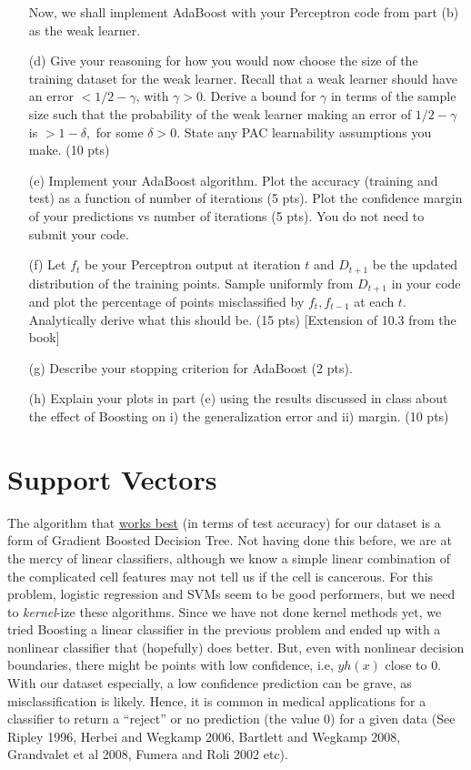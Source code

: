 \documentclass[12pt]{article}
\begin{document}
\begin{itemize}
		Now, we shall implement AdaBoost with your Perceptron code from part (b) as the weak learner. 
	\item[(d)] Give your reasoning for how you would now choose the size of the training dataset for the weak learner. Recall that a weak learner should have an error $< 1/2 - \gamma$, with $\gamma > 0$. Derive a bound for $\gamma$ in terms of the sample size such that the probability of the weak learner making an error of $1/2 - \gamma$ is $> 1- \delta,$ for some $\delta > 0.$ State any PAC learnability assumptions you make. (10 pts)
	\item[(e)] Implement your AdaBoost algorithm. Plot the accuracy (training and test) as a function of number of iterations (5 pts). Plot the confidence margin of your predictions vs number of iterations (5 pts). You do not need to submit your code.
	\item[(f)] Let $f_t$ be your Perceptron output at iteration $t$ and $D_{t+1}$ be the updated distribution of the training points. Sample uniformly from $D_{t+1}$ in your code and plot the percentage of points misclassified by $f_t, f_{t-1}$ at each $t$. Analytically derive what this should be. (15 pts) [Extension of 10.3 from the book]
	\item[(g)] Describe your stopping criterion for AdaBoost (2 pts).
	\item[(h)] Explain your plots in part (e) using the results discussed in class about the effect of Boosting on i) the generalization error and ii) margin.  (10 pts)


\end{itemize}

\section{Support Vectors}

The algorithm that \href{https://archive.ics.uci.edu/dataset/17/breast+cancer+wisconsin+diagnostic}{works best} (in terms of test accuracy) for our dataset is a form of Gradient Boosted Decision Tree. Not having done this before, we are at the mercy of linear classifiers, although we know a simple linear combination of the complicated cell features may not tell us if the cell is cancerous. For this problem, logistic regression and SVMs seem to be good performers, but we need to \emph{kernel}-ize these algorithms. Since we have not done kernel methods yet, we tried Boosting a linear classifier in the previous problem and ended up with a nonlinear classifier that (hopefully) does better.
But, even with nonlinear decision boundaries, there might be points with low confidence, i.e, $y h(x)$ close to 0. With our dataset especially, a low confidence prediction can be grave, as misclassification is likely. Hence, it is common in medical applications for a classifier to return a ``reject'' or no prediction (the value 0) for a given data (See Ripley 1996, Herbei and Wegkamp 2006, Bartlett and Wegkamp 2008, Grandvalet et al 2008, Fumera and Roli 2002 etc). 
\end{document}
